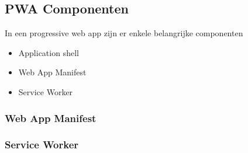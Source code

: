 \subsection{PWA Componenten}
In een progressive web app zijn er enkele belangrijke componenten
\begin{itemize}  
	\item Application shell
	\item Web App Manifest
	\item Service Worker
\end{itemize}

\subsubsection{Web App Manifest}

\subsubsection{Service Worker}

